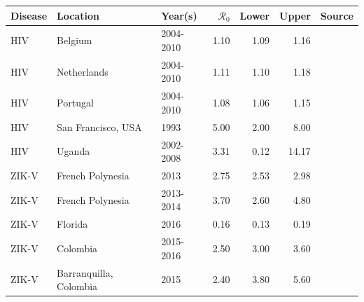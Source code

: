 \documentclass[12pt]{article}
\newcommand{\rr}{\ensuremath{\mathcal{R}_0}}
\begin{document}
\begin{landscape}
\begin{table}
\centering
\begin{tabular}{@{}lllrrrl@{}}
\toprule
\textbf{Disease}    & \textbf{Location}                & \textbf{Year(s)}                 & \textbf{$\rr$} & \textbf{Lower} & \textbf{Upper} & \textbf{Source}                                                                                                                  \\ \midrule
HIV                 & Belgium                          & 2004-2010                     & 1.10          & 1.09           & 1.16           & \cite{coelho2011}   \\
HIV                 & Netherlands                      & 2004-2010                     & 1.11        & 1.10            & 1.18           & \cite{coelho2011}    \\
HIV                 & Portugal                         & 2004-2010                     & 1.08        & 1.06           & 1.15           & \cite{coelho2011}   \\
HIV                 & San Francisco, USA               & 1993                          & 5.00           & 2.00              & 8.00              & \cite{blower1994}    \\
HIV                 & Uganda                           & 2002-2008                     & 3.31        & 0.12           & 14.17          & \cite{nsubuga2014}    \\ \hline
ZIK-V                & French Polynesia                 & 2013                          & 2.75        & 2.53           & 2.98           & \cite{zhang2017}        \\
ZIK-V                & French Polynesia                 & 2013-2014                     & 3.70         & 2.60            & 4.80            & \cite{kucharski2016}  \\
ZIK-V                & Florida                          & 2016                          & 0.16        & 0.13           & 0.19           & \cite{dinh2016}       \\
ZIK-V                & Colombia                         & 2015-2016                     & 2.50         & 3.00              & 3.60            & \cite{nishiura2016}    \\
ZIK-V                & Barranquilla, Colombia           & 2015                          & 2.40         & 3.80            & 5.60            & \cite{towers2016}    \\

\end{tabular}
\end{table}
\end{landscape}
\end{document}

